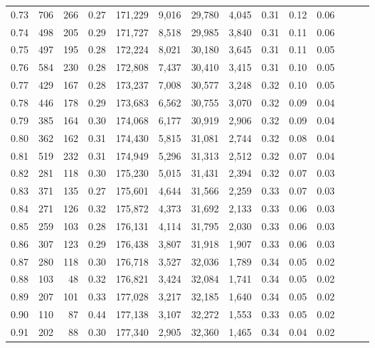 \begin{tabular}{rrrrrrrrrrrrrr}
0.73 &    706 &  266 &  0.27 &  171,229 &    9,016 &  29,780 &   4,045 &  0.31 &  0.12 &      0.06 \\
0.74 &    498 &  205 &  0.29 &  171,727 &    8,518 &  29,985 &   3,840 &  0.31 &  0.11 &      0.06 \\
0.75 &    497 &  195 &  0.28 &  172,224 &    8,021 &  30,180 &   3,645 &  0.31 &  0.11 &      0.05 \\
0.76 &    584 &  230 &  0.28 &  172,808 &    7,437 &  30,410 &   3,415 &  0.31 &  0.10 &      0.05 \\
0.77 &    429 &  167 &  0.28 &  173,237 &    7,008 &  30,577 &   3,248 &  0.32 &  0.10 &      0.05 \\
0.78 &    446 &  178 &  0.29 &  173,683 &    6,562 &  30,755 &   3,070 &  0.32 &  0.09 &      0.04 \\
0.79 &    385 &  164 &  0.30 &  174,068 &    6,177 &  30,919 &   2,906 &  0.32 &  0.09 &      0.04 \\
0.80 &    362 &  162 &  0.31 &  174,430 &    5,815 &  31,081 &   2,744 &  0.32 &  0.08 &      0.04 \\
0.81 &    519 &  232 &  0.31 &  174,949 &    5,296 &  31,313 &   2,512 &  0.32 &  0.07 &      0.04 \\
0.82 &    281 &  118 &  0.30 &  175,230 &    5,015 &  31,431 &   2,394 &  0.32 &  0.07 &      0.03 \\
0.83 &    371 &  135 &  0.27 &  175,601 &    4,644 &  31,566 &   2,259 &  0.33 &  0.07 &      0.03 \\
0.84 &    271 &  126 &  0.32 &  175,872 &    4,373 &  31,692 &   2,133 &  0.33 &  0.06 &      0.03 \\
0.85 &    259 &  103 &  0.28 &  176,131 &    4,114 &  31,795 &   2,030 &  0.33 &  0.06 &      0.03 \\
0.86 &    307 &  123 &  0.29 &  176,438 &    3,807 &  31,918 &   1,907 &  0.33 &  0.06 &      0.03 \\
0.87 &    280 &  118 &  0.30 &  176,718 &    3,527 &  32,036 &   1,789 &  0.34 &  0.05 &      0.02 \\
0.88 &    103 &   48 &  0.32 &  176,821 &    3,424 &  32,084 &   1,741 &  0.34 &  0.05 &      0.02 \\
0.89 &    207 &  101 &  0.33 &  177,028 &    3,217 &  32,185 &   1,640 &  0.34 &  0.05 &      0.02 \\
0.90 &    110 &   87 &  0.44 &  177,138 &    3,107 &  32,272 &   1,553 &  0.33 &  0.05 &      0.02 \\
0.91 &    202 &   88 &  0.30 &  177,340 &    2,905 &  32,360 &   1,465 &  0.34 &  0.04 &      0.02 \\

\end{tabular}
